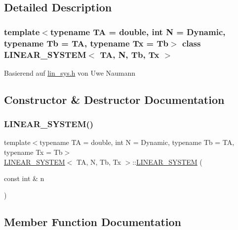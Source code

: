 \subsection{Detailed Description}
\subsubsection*{template$<$typename TA = double, int N = Dynamic, typename Tb = TA, typename Tx = Tb$>$\newline
class L\+I\+N\+E\+A\+R\+\_\+\+S\+Y\+S\+T\+E\+M$<$ T\+A, N, Tb, Tx $>$}

Basierend auf \mbox{\hyperlink{lin__sys_8h}{lin\+\_\+sys.\+h}} von Uwe Naumann 

\subsection{Constructor \& Destructor Documentation}
\mbox{\label{class_l_i_n_e_a_r___s_y_s_t_e_m_a7486740300aa9998e1aa4f9d90790eb2}} 
\subsubsection{\texorpdfstring{L\+I\+N\+E\+A\+R\+\_\+\+S\+Y\+S\+T\+E\+M()}{LINEAR\_SYSTEM()}}
{\footnotesize\ttfamily template$<$typename TA = double, int N = Dynamic, typename Tb = TA, typename Tx = Tb$>$ \\
\mbox{\hyperlink{class_l_i_n_e_a_r___s_y_s_t_e_m}{L\+I\+N\+E\+A\+R\+\_\+\+S\+Y\+S\+T\+EM}}$<$ TA, N, Tb, Tx $>$\+::\mbox{\hyperlink{class_l_i_n_e_a_r___s_y_s_t_e_m}{L\+I\+N\+E\+A\+R\+\_\+\+S\+Y\+S\+T\+EM}} (\begin{DoxyParamCaption}\item[{const int \&}]{n }\end{DoxyParamCaption})\hspace{0.3cm}{\ttfamily [inline]}}



\subsection{Member Function Documentation}
\mbox{\label{class_l_i_n_e_a_r___s_y_s_t_e_m_a307c8896bb3218768f016a2a24de3bcd}} 
